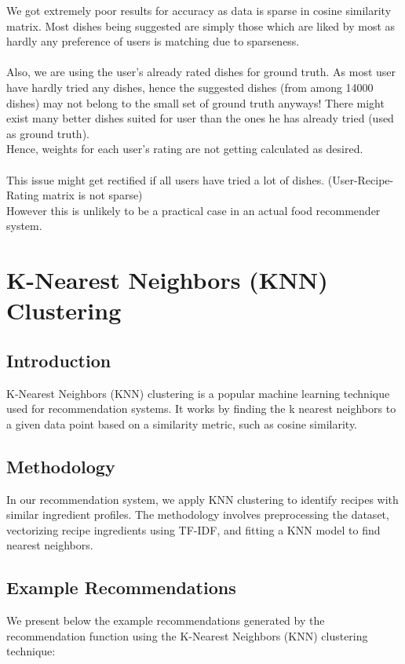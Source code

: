 \documentclass[conference]{IEEEtran}
\begin{document}
We got extremely poor results for accuracy as data is sparse in cosine similarity matrix. Most dishes being suggested are simply those which are liked by most as hardly any preference of users is matching due to sparseness.\\\\
Also, we are using the user's already rated dishes for ground truth. As most user have hardly tried any dishes, hence the suggested dishes (from among 14000 dishes) may not belong to the small set of ground truth anyways! There might exist many better dishes suited for user than the ones he has already tried (used as ground truth).\\
Hence, weights for each user's rating are not getting calculated as desired.\\\\
This issue might get rectified if all users have tried a lot of dishes. (User-Recipe-Rating matrix is not sparse)
\\
However this is unlikely to be a practical case in an actual food recommender system.

\section{K-Nearest Neighbors (KNN) Clustering}

\subsection{Introduction}
K-Nearest Neighbors (KNN) clustering is a popular machine learning technique used for recommendation systems. It works by finding the k nearest neighbors to a given data point based on a similarity metric, such as cosine similarity.

\subsection{Methodology}
In our recommendation system, we apply KNN clustering to identify recipes with similar ingredient profiles. The methodology involves preprocessing the dataset, vectorizing recipe ingredients using TF-IDF, and fitting a KNN model to find nearest neighbors.

\subsection{Example Recommendations}
We present below the example recommendations generated by the recommendation function using the K-Nearest Neighbors (KNN) clustering technique:
\end{document}

